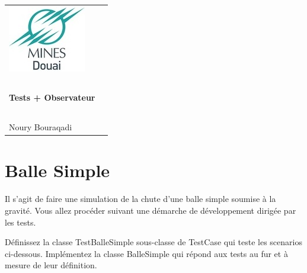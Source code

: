 \documentclass[12pt]{article}
\begin{document}
\vspace*{-3.5cm}
\hspace*{-2.5cm}
\begin{tabular}{lc}
\includegraphics{logoMinesDouai-small} 
& 
\begin{minipage}[b]{15cm}
\begin{center}
{\it TP Programmation par objet}\\~\\
{\Large\bf Tests + Observateur}\\~\\
{\sf Noury Bouraqadi}
\end{center}
\end{minipage}\\
\end{tabular}
\section{Balle Simple}
Il s'agit de faire une simulation de la chute d'une balle simple soumise à la gravité.
Vous allez procéder suivant une démarche de développement dirigée par les tests.

Définissez la classe {\sf TestBalleSimple} sous-classe de {\sf TestCase} qui teste les scenarios ci-dessous.
Implémentez la classe {\sf BalleSimple} qui répond aux tests au fur et à mesure de leur définition.
\end{document}
